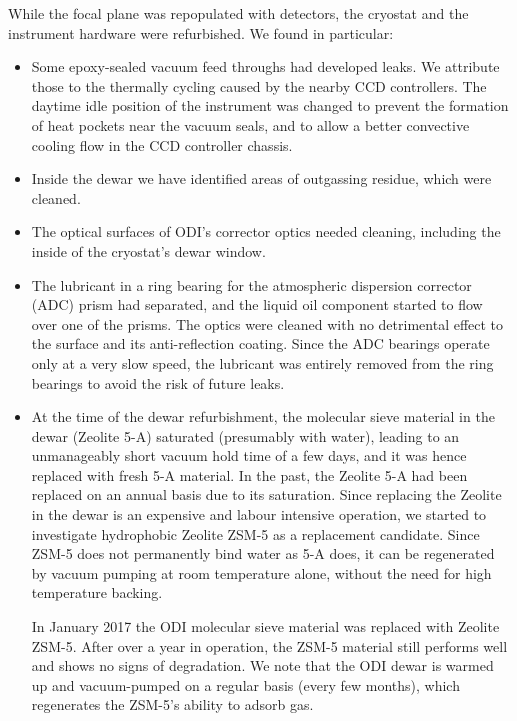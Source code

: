 \documentclass[]{spieman}
\begin{document}
While the focal plane was repopulated with detectors, the cryostat and the 
instrument hardware were refurbished. We found in particular:
\begin{itemize}
	\item Some epoxy-sealed vacuum feed throughs had developed  leaks. We 
	attribute those to the thermally cycling caused by the nearby CCD controllers. 
	The daytime idle position of the instrument was changed to prevent the 
	formation of heat pockets near the vacuum seals, and to allow a better
	convective cooling flow in the CCD controller chassis.
	
	\item Inside the dewar we have identified areas of outgassing residue, which 
	were cleaned.

	\item The optical surfaces of ODI's corrector optics needed cleaning,
	 including the inside of the cryostat's dewar window. 
	
	\item The lubricant in a ring bearing for the atmospheric dispersion corrector
(ADC) prism had separated, and the liquid oil component started to flow over
one of the prisms. The optics were cleaned with no detrimental effect to the
surface and its anti-reflection coating. Since the ADC bearings operate only at
a very slow speed, the lubricant was entirely removed from the ring bearings to
avoid the risk of future leaks.


\item  At the time of the dewar refurbishment, the molecular sieve material in
the dewar (Zeolite 5-A) saturated (presumably with water), leading to an
unmanageably short vacuum hold time of a few days, and it was hence replaced
with fresh 5-A material. In the past, the Zeolite 5-A had been replaced on an
annual basis due to its saturation. Since replacing the Zeolite in the dewar is
an expensive and labour intensive operation, we started to investigate
hydrophobic Zeolite ZSM-5 as a replacement candidate. Since ZSM-5 does not
permanently bind water as 5-A does, it can be regenerated by vacuum pumping at
room temperature alone, without the need for high temperature backing.

In January 2017 the ODI molecular sieve material was replaced with Zeolite
ZSM-5. After over a year in operation, the ZSM-5 material still performs well
and shows no signs of degradation. We note that the ODI dewar is warmed up and
vacuum-pumped on a regular basis (every few months), which regenerates the
ZSM-5's ability to adsorb gas.

\end{itemize}
\end{document}

